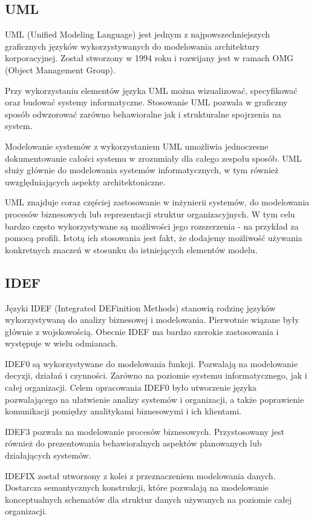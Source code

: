 \subsection{UML}
UML (Unified Modeling Language) jest jednym z najpowszechniejszych graficznych języków wykorzystywanych do modelowania architektury korporacyjnej. Został stworzony w 1994 roku i rozwijany jest w ramach OMG (Object Management Group). 

Przy wykorzystaniu elementów języka UML można wizualizować, specyfikować oraz budować systemy informatyczne. Stosowanie UML pozwala w graficzny sposób odwzorować zarówno behawioralne jak i strukturalne spojrzenia na system.

Modelowanie systemów z wykorzystaniem UML umożliwia jednoczesne dokumentowanie całości systemu w zrozumiały dla całego zespołu sposób. \cite{PlatIntGor} UML służy głównie do modelowania systemów informatycznych, w tym również uwzględniających aspekty architektoniczne. 

UML znajduje coraz częściej zastosowanie w inżynierii systemów, do  modelowania procesów biznesowych lub reprezentacji struktur organizacyjnych. W tym celu bardzo często wykorzystywane są możliwości jego rozszerzenia - na przykład za pomocą profili. Istotą ich stosowania jest fakt, że dodajemy możliwość używania konkretnych znaczeń w stosunku do istniejących elementów modelu.


\subsection{IDEF}
Języki IDEF (Integrated DEFinition Methods) stanowią rodzinę języków wykorzystywaną do analizy biznesowej i modelowania. Pierwotnie wiązane były głównie z wojskowością.  Obecnie IDEF ma bardzo szerokie zastosowania i występuje w wielu odmianach.

IDEF0 są wykorzystywane do modelowania funkcji. Pozwalają na modelowanie decyzji, działań i czynności. Zarówno na poziomie systemu informatycznego, jak i całej organizacji. Celem opracowania IDEF0 było utworzenie języka pozwalającego na ułatwienie analizy systemów i organizacji, a także poprawienie komunikacji pomiędzy analitykami biznesowymi i ich klientami. 

IDEF3 pozwala na modelowanie procesów biznesowych. Przystosowany jest również do prezentowania behawioralnych aspektów planowanych lub działających systemów. 

IDEFIX został utworzony z kolei z przeznaczeniem modelowania danych. Dostarcza semantycznych konstrukcji, które pozwalają na modelowanie konceptualnych schematów dla struktur danych używanych na poziomie całej organizacji.

